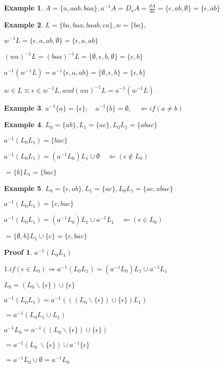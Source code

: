 \documentclass[graybox,envcountchap,sectrefs]{svmono1}
\newtheorem{myExt}{Example}
\newtheorem{myPf}{Proof}
\begin{document}
\begin{myExt}
$A = \{a,aab,baa\},a^{-1}A = D_{a}A = \frac{dA}{da} =\{\epsilon,ab,\emptyset\} = \{\epsilon,ab\}$
\end{myExt}

\begin{myExt}
	$L = \{ba,baa,baab,ca\}, w = \{ba\},$
	
	$w^{-1}L =\{\epsilon,a,ab,\emptyset\} = \{\epsilon,a,ab\}$
	
	${(wa)}^{-1}L = {(baa)}^{-1}L = \{\emptyset,\epsilon,b,\emptyset\} = \{\epsilon,b\}$
	
	$a^{-1}(w^{-1}L) = a^{-1}\{\epsilon,a,ab\} = \{\emptyset,\epsilon,b\} = \{\epsilon,b\}$
	
	$w\in L \equiv \epsilon \in w^{-1}L,and {(wa)}^{-1}L = a^{-1}(w^{-1}L)$
\end{myExt}

\begin{myExt}
	$a^{-1}\{a\} = \{\epsilon\}; \quad a^{-1}\{b\} = \emptyset,\quad\Leftarrow if (a\ne b)$
\end{myExt}

\begin{myExt}
	$L_0 = \{ab\},L_1 = \{ac\}, L_0L_1 = \{abac\}$
	
	$a^{-1}(L_0L_1) = \{bac\}$
	
	$a^{-1}(L_0L_1) = (a^{-1}L_0)L_1 \cup \emptyset \quad \Leftarrow(\epsilon \notin L_0)$
	
	$= \{b\}L_1 = \{bac\}$
\end{myExt}

\begin{myExt}
	$L_0 = \{\epsilon,ab\},L_1 = \{ac\}, L_0L_1 = \{ac,abac\}$
	
	$a^{-1}(L_0L_1) = \{c,bac\}$
	
	$a^{-1}(L_0L_1) = (a^{-1}L_0)L_1 \cup a^{-1}L_1 \quad\Leftarrow(\epsilon \in L_0)$
	
	$= \{\emptyset,b\}L_1 \cup \{c\} = \{c,bac\}$
\end{myExt}

\begin{myPf}
	$a^{-1}(L_0L_1)$
	
	$1. if(\epsilon \in L_0) \Rightarrow a^{-1}(L_0L_1) = (a^{-1}L_0)L_1 \cup a^{-1}L_1 $ 
	
	$L_0 = (L_0 \backslash \{\epsilon\}) \cup \{\epsilon\}$
	
	$a^{-1}(L_0L_1) = a^{-1}(((L_0 \backslash \{\epsilon\}) \cup \{\epsilon\})L_1)$
	
	$=a^{-1}(L_0L_1\cup L_1)$
	
	$a^{-1}L_0 = a^{-1}((L_0 \backslash \{\epsilon\}) \cup \{\epsilon\})$
	
	$=a^{-1}(L_0\ \backslash \{\epsilon \}) \cup a^{-1}\{\epsilon \}$
	
	$=a^{-1}L_0 \cup \emptyset = a^{-1}L_0$
\end{myPf}
	
\end{document}
